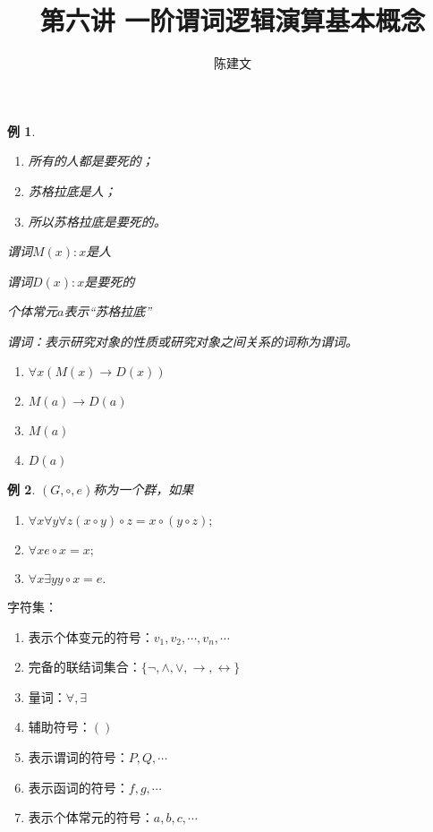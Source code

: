 \documentclass{article}
\newtheorem*{Example}{例}
\begin{document}
\begin{CJK*}{UTF8}{gbsn}
  \title{第六讲 一阶谓词逻辑演算基本概念}
  \author{陈建文}
  \maketitle

  \begin{Example}$\quad$

    \begin{enumerate}
      \item 所有的人都是要死的；
      \item 苏格拉底是人；
      \item 所以苏格拉底是要死的。
    \end{enumerate}

    谓词$M(x):x$是人

    谓词$D(x):x$是要死的

    个体常元$a$表示“苏格拉底”

    谓词：表示研究对象的性质或研究对象之间关系的词称为谓词。

    \begin{enumerate}
      \item $\forall x(M(x)\to D(x))$
      \item $M(a)\to D(a)$
      \item $M(a)$
      \item $D(a)$
    \end{enumerate}
  \end{Example}
  \begin{Example}
    $(G,\circ, e)$称为一个群，如果
    \begin{enumerate}
      \item $\forall x\forall y\forall z (x\circ y)\circ z=x\circ(y\circ z);$
      \item $\forall x e\circ x = x;$
      \item $\forall x \exists y y\circ x=e.$
    \end{enumerate}
  \end{Example}
  
  字符集：
    \begin{enumerate}
      \item 表示个体变元的符号：$v_1,v_2,\cdots,v_n,\cdots$
      \item 完备的联结词集合：$\{\lnot, \land, \lor, \to, \leftrightarrow \}$
      \item 量词：$\forall,\exists$
      \item 辅助符号：$()$
      \item 表示谓词的符号：$P,Q,\cdots$
      \item 表示函词的符号：$f,g,\cdots$
      \item 表示个体常元的符号：$a,b,c,\cdots$
    \end{enumerate}



\end{CJK*}
\end{document}
